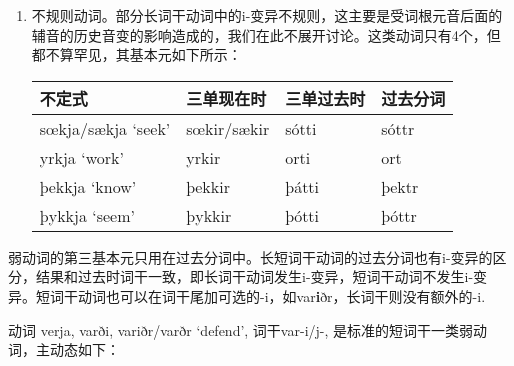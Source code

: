 \begin{enumerate}
    \item
          不规则动词。部分长词干动词中的i-变异不规则，这主要是受词根元音后面的辅音的历史音变的影响造成的，我们在此不展开讨论。这类动词只有4个，但都不算罕见，其基本元如下所示：

          \begin{longtable}{llll}
              \toprule
              不定式             & 三单现在时  & 三单过去时 & 过去分词 \\
              \midrule
              \endhead
              \bottomrule
              \endfoot
              sœkja/sækja `seek' & sœkir/sækir & sótti      & sóttr    \\
              yrkja `work'       & yrkir       & orti       & ort      \\
              þekkja `know'      & þekkir      & þátti      & þektr    \\
              þykkja `seem'      & þykkir      & þótti      & þóttr    \\
          \end{longtable}
\end{enumerate}

弱动词的第三基本元只用在过去分词中。长短词干动词的过去分词也有i-变异的区分，结果和过去时词干一致，即长词干动词发生i-变异，短词干动词不发生i-变异。短词干动词也可以在词干尾加可选的-i，如var\textbf{i}ðr，长词干则没有额外的-i.

动词 verja, varði, variðr/varðr `defend‌', 词干var-i/j-, 是标准的短词干一类弱动词，主动态如下：

